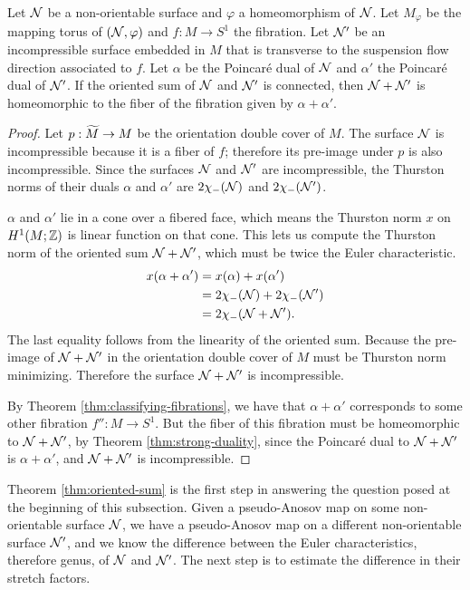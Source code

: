 \begin{thm}
  \label{thm:oriented-sum}
  Let $\mathcal{N}$ be a non-orientable surface and $\varphi$ a homeomorphism of $\mathcal{N}$.
  Let $M_\varphi$ be the mapping torus of $(\mathcal{N},\varphi)$ and $f:M\rightarrow S^1$ the fibration.
  Let $\mathcal{N}'$ be an incompressible surface embedded in $M$ that is transverse to the suspension flow direction associated to $f$.
  Let $\alpha$ be the Poincar\'e dual of $\mathcal{N}$ and $\alpha'$ the Poincar\'e dual of $\mathcal{N}'$.
  If the oriented sum of $\mathcal{N}$ and $\mathcal{N}'$ is connected, then $\mathcal{N} + \mathcal{N}'$ is homeomorphic to the fiber of the fibration given by $\alpha + \alpha'$.
\end{thm}
\begin{proof}
  Let $p:\widetilde{M}\rightarrow M$ be the orientation double cover of $M$.
  The surface $\mathcal{N}$ is incompressible because it is a fiber of $f$; therefore its pre-image under $p$ is also incompressible.
  Since the surfaces $\mathcal{N}$ and $\mathcal{N}'$ are incompressible, the Thurston norms of  their duals $\alpha$ and $\alpha'$ are $2\chi_-(\mathcal{N})$ and $2\chi_{-}(\mathcal{N}')$.

  $\alpha$ and $\alpha'$ lie in a cone over a fibered face, which means the Thurston norm $x$ on $H^1(M;\mathbb{Z})$ is linear function on that cone.
  This lets us compute the Thurston norm of the oriented sum $\mathcal{N} + \mathcal{N}'$, which must be twice the Euler characteristic.
  \begin{align*}
    x(\alpha + \alpha') &= x(\alpha) + x(\alpha') \\
                        &= 2\chi_-(\mathcal{N}) + 2\chi_-(\mathcal{N}') \\
                        &= 2\chi_-(\mathcal{N} + \mathcal{N}').
  \end{align*}
  The last equality follows from the linearity of the oriented sum.
  Because the pre-image of $\mathcal{N} + \mathcal{N}'$ in the orientation double cover of $M$ must be Thurston norm minimizing.
  Therefore the surface $\mathcal{N}+\mathcal{N}'$ is incompressible.

  By Theorem \ref{thm:classifying-fibrations}, we have that $\alpha + \alpha'$ corresponds to some other fibration $f'':M\rightarrow S^1$.
  But the fiber of this fibration must be homeomorphic to $\mathcal{N} + \mathcal{N}'$, by Theorem \ref{thm:strong-duality}, since the Poincar\'e dual to $\mathcal{N} + \mathcal{N}'$ is $\alpha + \alpha'$, and $\mathcal{N} + \mathcal{N}'$ is incompressible.
\end{proof}

Theorem \ref{thm:oriented-sum} is the first step in answering the question posed at the beginning of this subsection.
Given a pseudo-Anosov map on some non-orientable surface $\mathcal{N}$, we have a pseudo-Anosov map on a different non-orientable surface $\mathcal{N}'$, and we know the difference between the Euler characteristics, therefore genus, of $\mathcal{N}$ and $\mathcal{N}'$.
The next step is to estimate the difference in their stretch factors.

